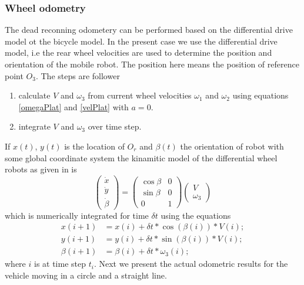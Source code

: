 \subsubsection{Wheel odometry }
The dead reconning odometery can be performed based on the differential drive model ot the bicycle model. In the present case we use the differential drive model, i.e the rear wheel velocities are used to determine the position and orientation of the mobile robot. The position here means the position of reference point $O_3$. The steps are follower
\begin{enumerate}
	\item calculate $V$ and $\omega_3$ from current wheel velocities $\omega_1$  and  $\omega_2$  using equations \ref{omegaPlat} and \ref{velPlat} with $a=0$.
	\item integrate $V$ and $\omega_3$ over time step.
\end{enumerate}
If $x(t)$, $y(t)$ is the location of $O_r$  and $\beta(t)$ the orientation of robot with some global coordinate system the kinamitic model of the differential wheel robots as given in \cite{campion1996structural} is 
\begin{equation}
\begin{pmatrix}
\dot{x}\\\dot{y}\\\dot{\beta}
\end{pmatrix}=
\begin{pmatrix}
\cos\beta & 0\\
\sin\beta & 0\\
0&1
\end{pmatrix}
\begin{pmatrix}
V\\\omega_3
\end{pmatrix}
\end{equation}
which is numerically integrated for time $\delta t$ using the equations
\begin{align}
 x(i+1)&=x(i)+\delta t*\cos(\beta(i))*V(i);\\
y(i+1)&=y(i)+\delta t*\sin(\beta(i))*V(i);\\
\beta(i+1)&=\beta(i)+\delta t*\omega_3(i);
\end{align}
where $i$ is at time step $t_i$. Next we present the actual odometric results for the vehicle moving in a circle and a straight line.
